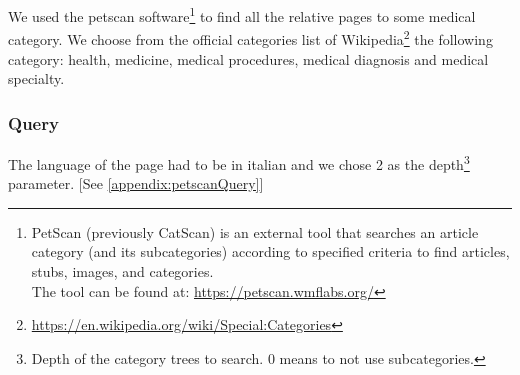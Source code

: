 We used the petscan software\footnote{PetScan (previously CatScan) is an external tool that searches an article category (and its subcategories) according to specified criteria to find articles, stubs, images, and categories.\\The tool can be found at: \url{https://petscan.wmflabs.org/}} to find all the relative pages to some medical category. We choose from the official categories list of Wikipedia\footnote{\url{https://en.wikipedia.org/wiki/Special:Categories}} the following category: health, medicine, medical procedures, medical diagnosis and medical specialty.

\subsubsection{Query}
The language of the page had to be in italian and we chose 2 as the depth\footnote{Depth of the category trees to search. 0 means to not use subcategories.} parameter. [See \ref{appendix:petscanQuery}]

